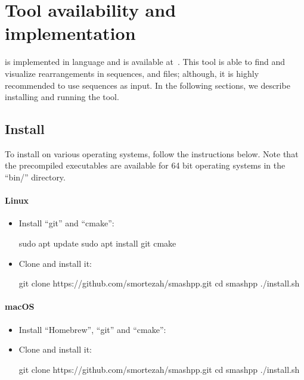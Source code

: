 \clearpage
\section{Tool availability and implementation}
\label{sec.tool}
\smashpp is implemented in \cpp language and is available at~\cite{web-smashpp}. This tool is able to find and visualize rearrangements in sequences, \fasta and \fastq files; although, it is highly recommended to use sequences as input. In the following sections, we describe installing and running the \smashpp tool.

\subsection{Install}
To install \smashpp on various operating systems, follow the instructions below. Note that the precompiled executables are available for 64 bit operating systems in the ``bin/'' directory.


\paragraph{Linux}
\begin{itemize}
  \item Install ``git'' and ``cmake'':
\begin{code}[style=bash]
sudo apt update
sudo apt install git cmake
\end{code}
\item Clone \smashpp and install it:
\begin{code}[style=bash]
git clone https://github.com/smortezah/smashpp.git
cd smashpp
./install.sh
\end{code}
\end{itemize}

\paragraph{macOS}
\begin{itemize}
    \item Install ``Homebrew'', ``git'' and ``cmake'':
\item Clone \smashpp and install it:
\begin{code}[style=bash]
git clone https://github.com/smortezah/smashpp.git
cd smashpp
./install.sh
\end{code}
\end{itemize}

